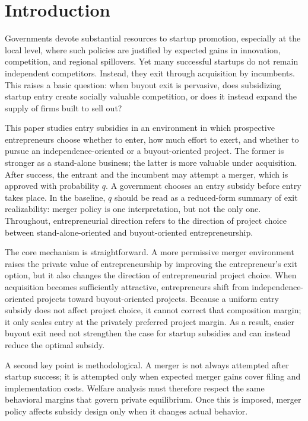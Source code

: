 \section{Introduction}\label{sec:intro}

Governments devote substantial resources to startup promotion, especially at the local level, where such policies are justified by expected gains in innovation, competition, and regional spillovers. Yet many successful startups do not remain independent competitors. Instead, they exit through acquisition by incumbents. This raises a basic question: when buyout exit is pervasive, does subsidizing startup entry create socially valuable competition, or does it instead expand the supply of firms built to sell out?

This paper studies entry subsidies in an environment in which prospective entrepreneurs choose whether to enter, how much effort to exert, and whether to pursue an independence-oriented or a buyout-oriented project. The former is stronger as a stand-alone business; the latter is more valuable under acquisition. After success, the entrant and the incumbent may attempt a merger, which is approved with probability \(q\). A government chooses an entry subsidy before entry takes place. In the baseline, \(q\) should be read as a reduced-form summary of exit realizability: merger policy is one interpretation, but not the only one. Throughout, entrepreneurial direction refers to the direction of project choice between stand-alone-oriented and buyout-oriented entrepreneurship.

The core mechanism is straightforward. A more permissive merger environment raises the private value of entrepreneurship by improving the entrepreneur's exit option, but it also changes the direction of entrepreneurial project choice. When acquisition becomes sufficiently attractive, entrepreneurs shift from independence-oriented projects toward buyout-oriented projects. Because a uniform entry subsidy does not affect project choice, it cannot correct that composition margin; it only scales entry at the privately preferred project margin. As a result, easier buyout exit need not strengthen the case for startup subsidies and can instead reduce the optimal subsidy.

A second key point is methodological. A merger is not always attempted after startup success; it is attempted only when expected merger gains cover filing and implementation costs. Welfare analysis must therefore respect the same behavioral margins that govern private equilibrium. Once this is imposed, merger policy affects subsidy design only when it changes actual behavior.

